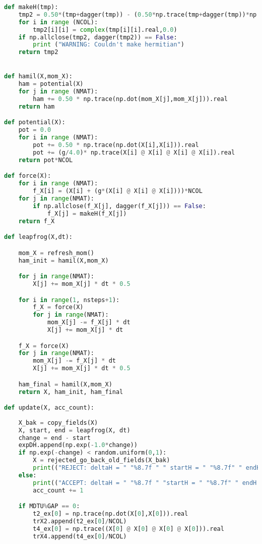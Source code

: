 \begin{lstlisting}[language=Python]
def makeH(tmp):
    tmp2 = 0.50*(tmp+dagger(tmp)) - (0.50*np.trace(tmp+dagger(tmp))*np.eye(NCOL))/NCOL
    for i in range (NCOL):
        tmp2[i][i] = complex(tmp[i][i].real,0.0)  
    if np.allclose(tmp2, dagger(tmp2)) == False:
        print ("WARNING: Couldn't make hermitian")
    return tmp2


def hamil(X,mom_X):
    ham = potential(X) 
    for j in range (NMAT):
        ham += 0.50 * np.trace(np.dot(mom_X[j],mom_X[j])).real 
    return ham  

def potential(X):
    pot = 0.0 
    for i in range (NMAT):
        pot += 0.50 * np.trace(np.dot(X[i],X[i])).real   
        pot += (g/4.0)* np.trace(X[i] @ X[i] @ X[i] @ X[i]).real
    return pot*NCOL

def force(X): 
    for i in range (NMAT): 
        f_X[i] = (X[i] + (g*(X[i] @ X[i] @ X[i])))*NCOL
    for j in range(NMAT):
        if np.allclose(f_X[j], dagger(f_X[j])) == False:
            f_X[j] = makeH(f_X[j])
    return f_X

def leapfrog(X,dt):

    mom_X = refresh_mom()
    ham_init = hamil(X,mom_X)

    for j in range(NMAT):
        X[j] += mom_X[j] * dt * 0.5 

    for i in range(1, nsteps+1):
        f_X = force(X)
        for j in range(NMAT):
            mom_X[j] -= f_X[j] * dt
            X[j] += mom_X[j] * dt

    f_X = force(X)
    for j in range(NMAT):
        mom_X[j] -= f_X[j] * dt
        X[j] += mom_X[j] * dt * 0.5 

    ham_final = hamil(X,mom_X)
    return X, ham_init, ham_final

def update(X, acc_count):
    
    X_bak = copy_fields(X) 
    X, start, end = leapfrog(X, dt) 
    change = end - start  
    expDH.append(np.exp(-1.0*change)) 
    if np.exp(-change) < random.uniform(0,1):
        X = rejected_go_back_old_fields(X_bak)
        print(("REJECT: deltaH = " "%8.7f " " startH = " "%8.7f" " endH = " "%8.7f" % (change, start, end)))
    else:   
        print(("ACCEPT: deltaH = " "%8.7f " "startH = " "%8.7f" " endH = " "%8.7f" % (change, start, end)))
        acc_count += 1 

    if MDTU%GAP == 0:
        t2_ex[0] = np.trace(np.dot(X[0],X[0])).real
        trX2.append(t2_ex[0]/NCOL)
        t4_ex[0] = np.trace((X[0] @ X[0] @ X[0] @ X[0])).real
        trX4.append(t4_ex[0]/NCOL)
        

\end{lstlisting}
